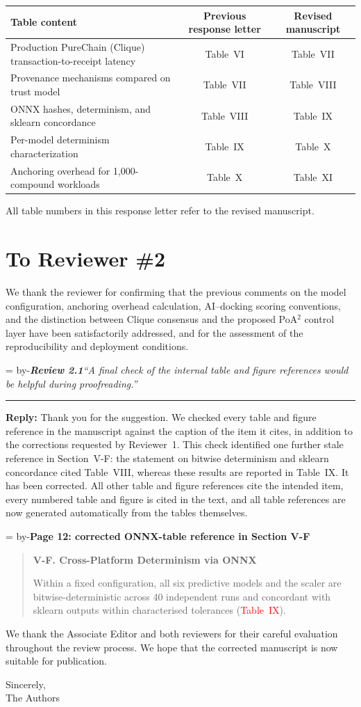 \documentclass[11pt]{article}
\newenvironment{excerpt}{\begin{quote}\small\sloppy}{\end{quote}}
\newcommand{\roomfor}[1]{\par\begingroup\dimen0=\pagegoal\advance\dimen0 by-\pagetotal\ifdim\dimen0<#1\baselineskip\newpage\fi\endgroup}
\newcommand{\review}[2]{\roomfor{10}\bigskip\noindent\textbf{\textit{Review #1}}\quad\textit{``#2''}\par\smallskip\hrule\medskip}
\newcommand{\reply}{\noindent\textbf{Reply:} }
\newcommand{\loc}[1]{\roomfor{7}\medskip\noindent\textbf{#1}\par\smallskip}
\newcommand{\mshead}[2]{\par\noindent\textbf{#1. #2}\par\smallskip}
\begin{document}
\begin{center}
\small
\begin{tabular}{@{}lcc@{}}
\toprule
Table content & Previous response letter & Revised manuscript \\
\midrule
Production PureChain (Clique) transaction-to-receipt latency & Table~VI & Table~VII \\
Provenance mechanisms compared on trust model & Table~VII & Table~VIII \\
ONNX hashes, determinism, and sklearn concordance & Table~VIII & Table~IX \\
Per-model determinism characterization & Table~IX & Table~X \\
Anchoring overhead for 1,000-compound workloads & Table~X & Table~XI \\
\bottomrule
\end{tabular}
\end{center}

All table numbers in this response letter refer to the revised manuscript.

\clearpage
\section*{To Reviewer \#2}
We thank the reviewer for confirming that the previous comments on the
model configuration, anchoring overhead calculation, AI--docking scoring
conventions, and the distinction between Clique consensus and the proposed
PoA$^2$ control layer have been satisfactorily addressed, and for the
assessment of the reproducibility and deployment conditions.

\review{2.1}{A final check of the internal table and figure references would be helpful during proofreading.}

\reply Thank you for the suggestion. We checked every table and figure
reference in the manuscript against the caption of the item it cites, in
addition to the corrections requested by Reviewer~1. This check identified
one further stale reference in Section~V-F: the statement on bitwise
determinism and sklearn concordance cited Table~VIII, whereas these results
are reported in Table~IX. It has been corrected. All other table and figure
references cite the intended item, every numbered table and figure is cited
in the text, and all table references are now generated automatically from
the tables themselves.

\loc{Page 12: corrected ONNX-table reference in Section V-F}
\begin{excerpt}
\mshead{V-F}{Cross-Platform Determinism via ONNX}

Within a fixed configuration, all six predictive models and the scaler are
bitwise-deterministic across 40 independent runs and concordant with sklearn
outputs within characterised tolerances (\textcolor{red}{Table~IX}).
\end{excerpt}

\bigskip
We thank the Associate Editor and both reviewers for their careful
evaluation throughout the review process. We hope that the corrected
manuscript is now suitable for publication.

\medskip
Sincerely,\\
The Authors
\end{document}
